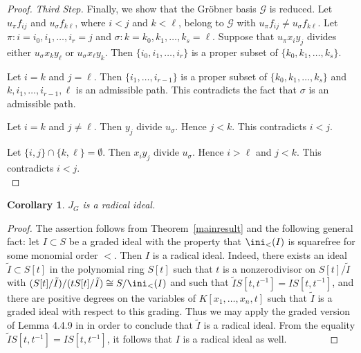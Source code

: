 \documentclass[11pt]{amsart}
\let\iso=\cong
\newtheorem{Corollary}[Theorem]{Corollary}
\begin{document}
\begin{proof}
\medskip
\noindent
{\em Third Step.}
Finally, we show that the Gr\"obner basis
${\mathcal G}$ is reduced.
Let $u_\pi f_{ij}$ and $u_\sigma f_{k\ell}$,
where $i < j$ and $k < \ell$, belong to
${\mathcal G}$ with $u_\pi f_{ij} \neq u_\sigma f_{k\ell}$.
Let $\pi : i = i_0, i_1, \ldots, i_r = j$
and $\sigma : k = k_0, k_1, \ldots, k_s = \ell$.
Suppose that $u_\pi x_iy_j$ divides either
$u_\sigma x_ky_\ell$ or $u_\sigma x_\ell y_k$.
Then $\{ i_0, i_1, \ldots, i_r \}$ is a proper subset
of $\{ k_0, k_1, \ldots, k_s \}$.

Let $i = k$ and $j = \ell$.
Then $\{ i_1, \ldots, i_{r-1} \}$ is a proper subset
of $\{ k_0, k_1, \ldots, k_s \}$
and $k, i_1, \ldots, i_{r-1}, \ell$ is an admissible path.
This contradicts the fact that $\sigma$ is an admissible path.

Let $i = k$ and $j \neq \ell$.
Then $y_j$ divide $u_\sigma$.
Hence $j < k$.  This contradicts $i < j$.

Let $\{ i, j \} \cap \{ k, \ell \} = \emptyset$.
Then $x_iy_j$ divide $u_\sigma$.
Hence $i > \ell$ and $j < k$.
This contradicts $i < j$.
\, \, \, \, \, \, \, \, \, \,
\, \, \, \, \, \, \, \, \, \,
\, \, \, \, \, \, \, \, \, \,
\, \, \, \, \, \, \, \, \, \,
\, \, \, \, \, \, \, \, \, \,
\, \, \, \, \, \,
\end{proof}




\begin{Corollary}
\label{radical}
$J_G$ is a radical ideal.
\end{Corollary}

\begin{proof}
The assertion follows from Theorem~\ref{mainresult} and the following general fact: let $I\subset S$ be a graded ideal with the property that $\ini_<(I)$ is squarefree for some monomial order $<$. Then $I$ is a radical ideal. Indeed, there exists an ideal $\tilde{I}\subset S[t]$ in the polynomial ring $S[t]$   such that $t$ is a nonzerodivisor on $S[t]/\tilde{I}$ with $(S[t]/\tilde{I})/(tS[t]/\tilde{I})\iso S/\ini_<(I)$ and such  that $\tilde{I}S[t,t^{-1}]=IS[t,t^{-1}]$,  and there are positive degrees  on the variables of $K[x_1,\ldots,x_n, t]$ such that $\tilde{I}$ is a graded ideal with respect to this grading. Thus we may apply the graded version of Lemma 4.4.9 in \cite{BH}  in order to conclude that $\tilde{I}$ is a radical ideal. From the equality $\tilde{I}S[t,t^{-1}]=IS[t,t^{-1}]$, it follows that $I$ is a radical ideal as well.
\, \, \, \, \, \, \, \,
\end{proof}
\end{document}
